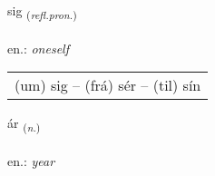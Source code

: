 \documentclass[frontgrid, backgrid]{flacards}\usepackage[]{graphicx}\usepackage[]{xcolor}
\begin{document}
\renewcommand{\blhead}{\vskip5pt {\small\bfseries\footnotesize Fornafn | Pronoun }}
\renewcommand{\bcfoot}{\vskip5pt \hspace{2pt}{\small\bfseries\footnotesize 1K}}


{sig \small{\textsubscript{(\textit{refl.pron.})}} \\[1ex] %
\textphonetic{[sɪːɣ]} \\
en.: \emph{oneself} \\  [2ex]
\renewcommand*{\arraystretch}{0.8}
\begin{tabular}{l}
(um) sig -- (frá) sér -- (til) sín \\ 
\end{tabular}
}

\renewcommand{\flhead}{\vskip5pt \fboxsep=0pt {\small\bfseries\footnotesize Nafnorð | Noun}}
\renewcommand{\fcfoot}{\vskip5pt \fboxsep=0pt \hspace{2pt}{\small\bfseries\footnotesize 1K}}

\renewcommand{\blhead}{\vskip5pt {\small\bfseries\footnotesize Nafnorð | Noun }}
\renewcommand{\bcfoot}{\vskip5pt \hspace{2pt}{\small\bfseries\footnotesize 1K}}


{ár \small{\textsubscript{(\textit{n.})}} \\[1ex] %
\textphonetic{[auːr]} \\
en.: \emph{year} \\  [2ex]
\renewcommand*{\arraystretch}{0.8}
}

\renewcommand{\flhead}{\vskip5pt \fboxsep=0pt {\small\bfseries\footnotesize Fornafn | Pronoun}}
\renewcommand{\fcfoot}{\vskip5pt \fboxsep=0pt \hspace{2pt}{\small\bfseries\footnotesize 1K}}
\end{document}
